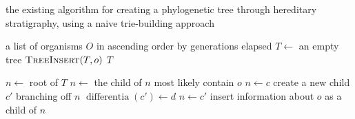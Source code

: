 \begin{algorithm}[h]
    \caption{the existing algorithm for creating a phylogenetic tree through hereditary stratigraphy, using a naive trie-building approach}
    \label{alg:old}
    \begin{algorithmic}[1]
        \Require a list of organisms $O$ in ascending order by generations elapsed
            \State $T \gets$ an empty tree
                \State $\textsc{TreeInsert}(T, o)$
            \EndFor
            \State \Return $T$
        \EndFunction

            \State $n \gets$ root of $T$
                    \State $n \gets$ the child of $n$ most likely contain $o$
                \EndWhile
                    \State $n \gets c$
                \Else 
                    \State create a new child $c'$ branching off $n$ 
                    \State $\operatorname{differentia}(c') \gets d$
                    \State $n \gets c'$
                \EndIf
            \EndFor
            \State insert information about $o$ as a child of $n$
        \EndFunction
    \end{algorithmic}
\end{algorithm}